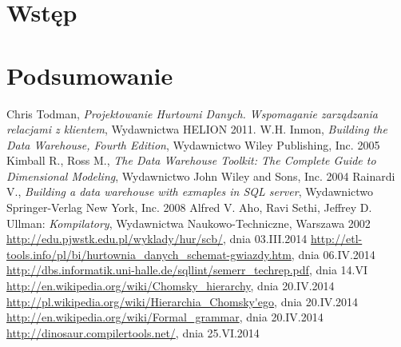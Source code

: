 \documentclass[a4paper,12pt]{ report}
\newcommand*\stdchapter{}
\let\stdchapter\chapter
\renewcommand*\chapter{%
\clearpage\ifodd\value{page}\else\mbox{}\clearpage\fi
\stdchapter}
\begin{document}


\tableofcontents
\setlength{\parskip}{2ex plus 0.5ex minus 0.5ex}


\chapter*{Wstęp}








  
\chapter*{Podsumowanie}


\listoffigures
{}

\renewcommand\lstlistlistingname{Listingi kodu}
\lstlistoflistings

\begin{thebibliography}{99}


Chris Todman, \textit{Projektowanie Hurtowni Danych. Wspomaganie zarządzania relacjami z klientem}, Wydawnictwa HELION 2011.
W.H. Inmon, \textit{Building the Data Warehouse, Fourth Edition}, Wydawnictwo Wiley Publishing, Inc. 2005
Kimball R., Ross M., \textit{ The Data Warehouse Toolkit: The Complete Guide to Dimensional Modeling}, Wydawnictwo John Wiley and Sons, Inc. 2004
 Rainardi V.,  \textit{Building a data warehouse with exmaples in SQL server}, Wydawnictwo  Springer-Verlag New York, Inc. 2008
  Alfred V. Aho, Ravi Sethi, Jeffrey D. Ullman: \textit{Kompilatory}, Wydawnictwa Naukowo-Techniczne, Warszawa 2002
   \url{http://edu.pjwstk.edu.pl/wyklady/hur/scb/}, dnia 03.III.2014
   \url{http://etl-tools.info/pl/bi/hurtownia_danych_schemat-gwiazdy.htm}, dnia 06.IV.2014
   \url{http://dbs.informatik.uni-halle.de/sqllint/semerr_techrep.pdf}, dnia 14.VI
   \url{http://en.wikipedia.org/wiki/Chomsky_hierarchy}, dnia 20.IV.2014
   \url{http://pl.wikipedia.org/wiki/Hierarchia_Chomsky'ego}, dnia 20.IV.2014
   \url{http://en.wikipedia.org/wiki/Formal_grammar}, dnia 20.IV.2014
  \url{http://dinosaur.compilertools.net/}, dnia 25.VI.2014


\end{thebibliography}
\end{document}
